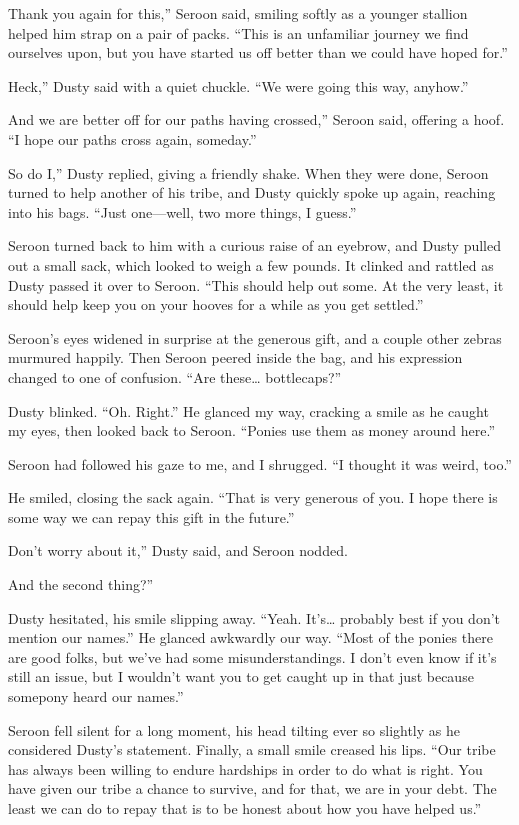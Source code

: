 \leavevmode{}Thank you again for this,” Seroon said, smiling softly as a younger stallion helped him strap on a pair of packs. “This is an unfamiliar journey we find ourselves upon, but you have started us off better than we could have hoped for.”

\leavevmode{}Heck,” Dusty said with a quiet chuckle. “We were going this way, anyhow.”

\leavevmode{}And we are better off for our paths having crossed,” Seroon said, offering a hoof. “I hope our paths cross again, someday.”

\leavevmode{}So do I,” Dusty replied, giving a friendly shake. When they were done, Seroon turned to help another of his tribe, and Dusty quickly spoke up again, reaching into his bags. “Just one—well, two more things, I guess.”

Seroon turned back to him with a curious raise of an eyebrow, and Dusty pulled out a small sack, which looked to weigh a few pounds. It clinked and rattled as Dusty passed it over to Seroon. “This should help out some. At the very least, it should help keep you on your hooves for a while as you get settled.”

Seroon’s eyes widened in surprise at the generous gift, and a couple other zebras murmured happily. Then Seroon peered inside the bag, and his expression changed to one of confusion. “Are these… bottlecaps?”

Dusty blinked. “Oh. Right.” He glanced my way, cracking a smile as he caught my eyes, then looked back to Seroon. “Ponies use them as money around here.”

Seroon had followed his gaze to me, and I shrugged. “I thought it was weird, too.”

He smiled, closing the sack again. “That is very generous of you. I hope there is some way we can repay this gift in the future.”

\leavevmode{}Don’t worry about it,” Dusty said, and Seroon nodded.

\leavevmode{}And the second thing?”

Dusty hesitated, his smile slipping away. “Yeah. It’s… probably best if you don’t mention our names.” He glanced awkwardly our way. “Most of the ponies there are good folks, but we’ve had some misunderstandings. I don’t even know if it’s still an issue, but I wouldn’t want you to get caught up in that just because somepony heard our names.”

Seroon fell silent for a long moment, his head tilting ever so slightly as he considered Dusty’s statement. Finally, a small smile creased his lips. “Our tribe has always been willing to endure hardships in order to do what is right. You have given our tribe a chance to survive, and for that, we are in your debt. The least we can do to repay that is to be honest about how you have helped us.”

